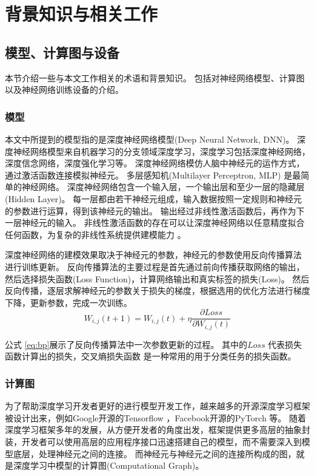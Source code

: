 \chapter{背景知识与相关工作}

\section{模型、计算图与设备}
本节介绍一些与本文工作相关的术语和背景知识。
包括对神经网络模型、计算图以及神经网络训练设备的介绍。
\subsection{模型}
本文中所提到的模型指的是深度神经网络模型(Deep Neural Network, DNN)。
深度神经网络模型来自机器学习的分支领域深度学习，深度学习包括深度神经网络，深度信念网络，深度强化学习等。
深度神经网络模仿人脑中神经元的运作方式，通过激活函数连接模拟神经元。
多层感知机(Multilayer Perceptron, MLP) 是最简单的神经网络。
深度神经网络包含一个输入层，一个输出层和至少一层的隐藏层(Hidden Layer)。
每一层都由若干神经元组成，输入数据按照一定规则和神经元的参数进行运算，得到该神经元的输出。
输出经过非线性激活函数后，再作为下一层神经元的输入。
非线性激活函数的存在可以让深度神经网络以任意精度拟合任何函数，为复杂的非线性系统提供建模能力 。

深度神经网络的建模效果取决于神经元的参数，神经元的参数使用反向传播算法 进行训练更新。
反向传播算法的主要过程是首先通过前向传播获取网络的输出，然后选择损失函数(Loss Function)，计算网络输出和真实标签的损失(Loss)。
然后反向传播，逐层求解神经元的参数关于损失的梯度，根据选用的优化方法进行梯度下降，更新参数，完成一次训练。
\begin{equation}
	\label{eq:bp}
	W_{i,j}(t+1) = W_{i,j}(t) + \eta \frac{\partial Loss}{\partial W_{i,j}(t)}
\end{equation}

公式 \ref{eq:bp}展示了反向传播算法中一次参数更新的过程。
其中的$Loss$ 代表损失函数计算出的损失，交叉熵损失函数 是一种常用的用于分类任务的损失函数。

\subsection{计算图}

为了帮助深度学习开发者更好的进行模型开发工作，越来越多的开源深度学习框架被设计出来，例如Google开源的Tensorflow ，Facebook开源的PyTorch 等。
随着深度学习框架多年的发展，从方便开发者的角度出发，框架提供更多高层的抽象封装，开发者可以使用高层的应用程序接口迅速搭建自己的模型，而不需要深入到模型底层，处理神经元之间的连接。
而神经元与神经元之间的连接所构成的图，就是深度学习中模型的计算图(Computational Graph)。

